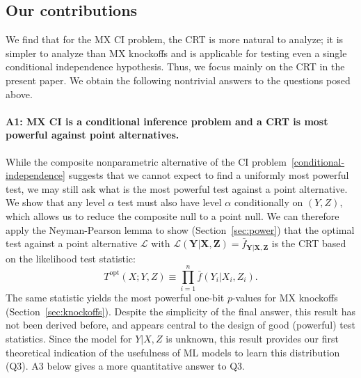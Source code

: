\documentclass[12pt]{article}
\theoremstyle{definition}
\theoremstyle{remark}
\newcommand{\prx}{\bm X}
\newcommand{\srx}{X}
\newcommand{\prz}{\bm Z}
\newcommand{\srz}{Z}
\newcommand{\pry}{{\bm Y}}
\newcommand{\sry}{Y}
\begin{document}
\subsection{Our contributions}



We find that for the MX CI problem, the CRT is more natural to analyze; it is simpler to analyze than MX knockoffs and is applicable for testing even a single conditional independence hypothesis. Thus, we focus mainly on the CRT in the present paper. We obtain the following nontrivial answers to the questions posed above.

\paragraph{A1: MX CI is a conditional inference problem and a CRT is most powerful against point alternatives.}

While the composite nonparametric alternative of the CI problem~\eqref{conditional-independence} suggests that we cannot expect to find a uniformly most powerful test, we may still ask what is the most powerful test against a point alternative. We show that any level $\alpha$ test must also have level $\alpha$ conditionally on $(\sry, \srz)$, which allows us to reduce the composite null to a point null. We can therefore apply the Neyman-Pearson lemma to show (Section~\ref{sec:power}) that the optimal test against a point alternative $\mathcal L$ with $\mathcal L(\pry|\prx,\prz) = \bar f_{\pry|\prx,\prz}$ is the CRT based on the likelihood test statistic:
\begin{equation}
	T^{\text{opt}}(\srx; \sry, \srz) \equiv \prod_{i = 1}^n \bar f(\sry_i|\srx_i, \srz_i).
\end{equation}
The same statistic yields the most powerful one-bit $p$-values for MX knockoffs (Section~\ref{sec:knockoffs}). Despite the simplicity of the final answer, this result has not been derived before, and appears central to the design of good (powerful) test statistics. Since the model for $Y|X,Z$ is unknown, this result provides our first theoretical indication of the usefulness of ML models to learn this distribution (Q3). A3 below gives a more quantitative answer to Q3.
\end{document}
